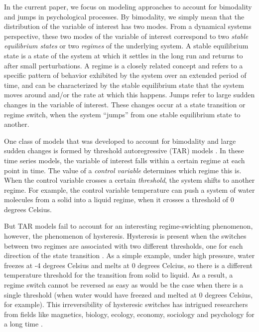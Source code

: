 \documentclass{article}
\begin{document}
In the current paper, we focus on modeling approaches to account for bimodality and jumps in psychological processes.
By bimodality, we simply mean that the distribution of the variable of interest has two modes.
From a dynamical systems perspective, these two modes of the variable of interest correspond to two \textit{stable equilibrium states} or two \textit{regimes} of the underlying system.
A stable equilibrium state is a state of the system at which it settles in the long run and returns to after small perturbations.
A regime is a closely related concept and refers to a specific pattern of behavior exhibited by the system over an extended period of time, and can be characterized by the stable equilibrium state that the system moves around and/or the rate at which this happens.
Jumps refer to large sudden changes in the variable of interest.
These changes occur at a state transition or regime switch, when the system ``jumps'' from one stable equilibrium state to another.

One class of models that was developed to account for bimodality and large sudden changes is formed by threshold autoregressive (TAR) models \citep{tar}.
In these time series models, the variable of interest falls within a certain regime at each point in time. 
The value of a \textit{control variable} determines which regime this is. 
When the control variable crosses a certain \textit{threshold}, the system shifts to another regime.
For example, the control variable temperature can push a system of water molecules from a solid into a liquid regime, when it crosses a threshold of 0 degrees Celsius.

But TAR models fail to account for an interesting regime-swichting phenomenon, however, the phenomenon of hysteresis. 
Hysteresis is present when the switches between two regimes are associated with two different thresholds, one for each direction of the state transition \citep{gilmore, strogatz}.
As a simple example, under high pressure, water freezes at -4 degrees Celsius and melts at 0 degrees Celcius, so there is a different temperature threshold for the transition from solid to liquid. As a result, a regime switch cannot be reversed as easy as would be the case when there is a single threshold (when water would have freezed and melted at 0 degrees Celsius, for example).
This irreversibility of hysteresic switches has intrigued researchers from fields like magnetics, biology, ecology, economy, sociology and psychology for a long time \citep{hysteresis_mathematical}.
\end{document}
